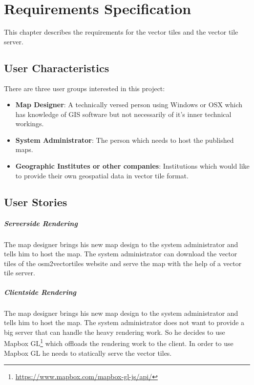 \chapter{Requirements Specification}\label{requirements_specification}

This chapter describes the requirements for the vector tiles and the vector tile server.

\section{User Characteristics}\label{user_characteristics}

There are three user groups interested in this project:

\begin{itemize}
\item
  \textbf{Map Designer}: A technically versed person using Windows or
  OSX which has knowledge of GIS software but not necessarily of it's
  inner technical workings.
\item
  \textbf{System Administrator}: The person which needs to host the
  published maps.
\item
  \textbf{Geographic Institutes or other companies}: Institutions which would like to provide their own geospatial data in vector tile format. 
\end{itemize}

\section{User Stories}\label{user_stories}
\paragraph{Serverside Rendering}
The map designer brings his new map design to the system administrator and tells him to host the map. The system administrator can download the vector tiles of the osm2vectortiles website and serve the map with the help of a vector tile server.

\paragraph{Clientside Rendering}
The map designer brings his new map design to the system administrator and tells him to host the map. The system administrator does not want to provide a big server that can handle the heavy rendering work. So he decides to use Mapbox GL\footnote{\url{https://www.mapbox.com/mapbox-gl-js/api/}} which offloads the rendering work to the client. In order to use Mapbox GL he needs to statically serve the vector tiles. 

